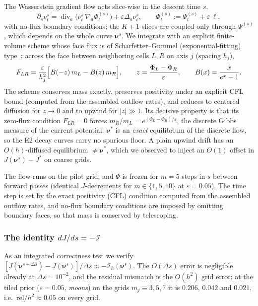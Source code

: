 \documentclass[11pt,leqno]{amsart}
\newcommand{\cI}{\mathcal{I}}
\newcommand{\bnu}{\boldsymbol{\nu}}
\newcommand{\eps}{\varepsilon}
\DeclareMathOperator{\divg}{div}
\numberwithin{equation}{section}
\theoremstyle{definition}
\begin{document}
The Wasserstein gradient flow acts slice-wise in the descent time $s$,
\begin{equation}
\label{eq:fp}
\partial_s\nu^s_{t}
=\divg_a\!\bigl(\nu^s_{t}\,\nabla_a\Phi^{(s)}_t\bigr)+\eps\Delta_a\nu^s_t,
\qquad
\Phi^{(s)}_t:=\Psi^{(s)}_t+\eps\,\ell ,
\end{equation}
with no-flux boundary conditions; the $K+1$ slices are coupled only through
$\Psi^{(s)}$, which depends on the whole curve $\bnu^s$.  We integrate with
an explicit finite-volume scheme whose face flux is of Scharfetter--Gummel
(exponential-fitting) type~\cite{ScharfetterGummel,ChainaisFilbet}: across
the face between neighboring cells $L,R$ on axis $j$ (spacing $h_j$),
\begin{equation}
\label{eq:sg}
F_{LR}=\frac{\eps}{h_j^2}\Bigl[B(-z)\,m_L-B(z)\,m_R\Bigr],
\qquad
z=\frac{\Phi_L-\Phi_R}{\eps},
\qquad
B(x)=\frac{x}{e^x-1}.
\end{equation}
The scheme conserves mass exactly, preserves positivity under an explicit
CFL bound (computed from the assembled outflow rates), and reduces to
centered diffusion for $z\to0$ and to upwind for $|z|\gg1$.  Its decisive
property is that its zero-flux condition $F_{LR}=0$ forces
$m_R/m_L=e^{(\Phi_L-\Phi_R)/\eps}$, the discrete Gibbs measure of the current
potential: $\bnu^*$ is an \emph{exact} equilibrium of the discrete flow, so
the E2 decay curves carry no spurious floor.  A plain upwind drift has an
$O(h)$-diffused equilibrium $\neq\bnu^*$, which we observed to inject an
$O(1)$ offset in $J(\bnu^s)-J^*$ on coarse grids.

The flow runs on the pilot grid, and $\Psi$ is frozen for $m=5$ steps in
$s$ between forward passes (identical $J$-decrements for $m\in\{1,5,10\}$ at
$\eps=0.05$).
The time step is set by the exact positivity (CFL) condition computed from the assembled outflow rates, and no-flux boundary conditions are imposed by omitting boundary faces, so that mass is conserved by telescoping.

\subsubsection*{The identity $dJ/ds=-\cI$}
As an integrated correctness test we verify
$[J(\bnu^{s+\Delta s})-J(\bnu^s)]/\Delta s\approx-\cI_h(\bnu^s)$.  The
$O(\Delta s)$ error is negligible already at $\Delta s=10^{-2}$, and the
residual mismatch is the $O(h^2)$ grid error: at the tiled prior
($\eps=0.05$, \emph{moons}) on the grids $m_j\equiv3,5,7$ it is
$0.206$, $0.042$ and $0.021$, i.e.\ $\mathrm{rel}/h^2\approx0.05$ on
every grid.
\end{document}
